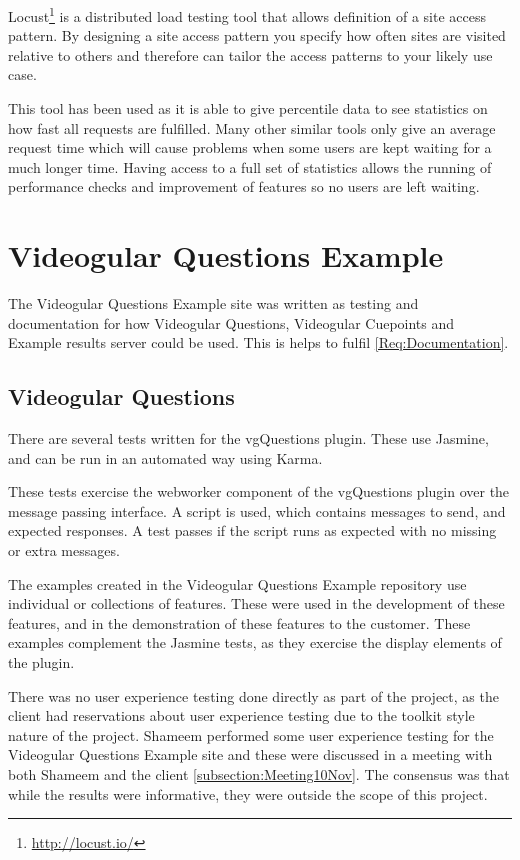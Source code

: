 Locust\footnote{\url{http://locust.io/}} is a distributed load testing tool that allows definition of a site access pattern. By designing a site access pattern you specify how often sites are visited relative to others and therefore can tailor the access patterns to your likely use case.

This tool has been used as it is able to give percentile data to see statistics on how fast all requests are fulfilled. Many other similar tools only give an average request time which will cause problems when some users are kept waiting for a much longer time. Having access to a full set of statistics allows the running of performance checks and improvement of features so no users are left waiting.

\section{Videogular Questions Example} 
\label{Section:Videogular Questions Example}

The Videogular Questions Example site was written as testing and documentation for how Videogular Questions, Videogular Cuepoints and Example results server could be used. This is helps to fulfil \cref{Req:Documentation}.

\subsection{Videogular Questions}
\label{Subsection:Videogular Questions in example}

There are several tests written for the \gls{vgQuestions} plugin. These use Jasmine, and can be run in an automated way using Karma.

These tests exercise the \gls{webworker} component of the \gls{vgQuestions} plugin over the message passing interface. A script is used, which contains messages to send, and expected responses. A test passes if the script runs as expected with no missing or extra messages.

The examples created in the Videogular Questions Example repository use individual or collections of features. These were used in the development of these features, and in the demonstration of these features to the customer.  These examples complement the Jasmine tests, as they exercise the display elements of the plugin.

There was no user experience testing done directly as part of the project, as the client had reservations about user experience testing due to the toolkit style nature of the project. Shameem performed some user experience testing for the Videogular Questions Example site and these were discussed in a meeting with both Shameem and the client \autoref{subsection:Meeting10Nov}. The consensus was that while the results were informative, they were outside the scope of this project.

